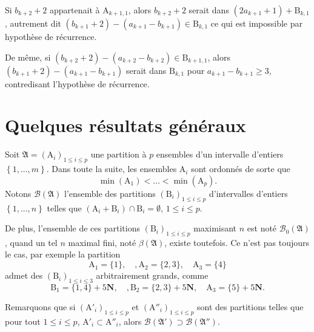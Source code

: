 \documentclass[11pt, oneside]{article}   	%
\newcommand{\interval}[2]{\left\{ #1, \dots, #2 \right\}}
\begin{document}
Si $b_{k+2} + 2$ appartenait à $\mathrm{A}_{k + 1, 1}$, alors $b_{k+2} + 2$ serait dans $(2 a_{k+1} + 1) + \mathrm{B}_{k, 1}$,
autrement dit $(b_{k+1} + 2) - (a_{k+1} - b_{k+1}) \in \mathrm{B}_{k, 1}$ ce qui est impossible par hypothèse de récurrence.

De même, si $(b_{k+2} + 2) - (a_{k+2} - b_{k+2}) \in \mathrm{B}_{k+1, 1}$, alors
$(b_{k+1} + 2) - (a_{k+1} - b_{k+1})$ serait dans $\mathrm{B}_{k, 1}$ pour $a_{k+1} - b_{k+1} \geqslant 3$,
contredisant l'hypothèse de récurrence.


\section{Quelques résultats généraux}

Soit $\mathfrak{A} = (\mathrm{A}_i)_{1 \leq i \leq p}$ une partition à $p$ ensembles d'un intervalle d'entiers $\interval{1}{m}$.
Dans toute la suite, les ensembles $\mathrm{A}_i$ sont ordonnés de sorte que
\begin{equation}\label{eq:ordre_min}
 \min(\mathrm{A}_1) < \dots < \min(\mathrm{A}_p).
\end{equation}
Notons $\mathcal{B}(\mathfrak{A})$ l'ensemble des partitions $(\mathrm{B}_i)_{1 \leqslant i \leqslant p}$ d'intervalles d'entiers $\interval{1}{n}$ telles que
$(\mathrm{A}_i + \mathrm{B}_i) \cap \mathrm{B}_i = \emptyset$, $1 \leqslant i \leqslant p$.

De plus, l'ensemble de ces partitions $(\mathrm{B}_i)_{1 \leqslant i \leqslant p}$ maximisant $n$ est noté $\mathcal{B}_0(\mathfrak{A})$,
quand un tel $n$ maximal fini, noté $\beta(\mathfrak{A})$, existe toutefois.
Ce n'est pas toujours le cas, par exemple la partition
\begin{equation}
 \mathrm{A}_1 = \{1\}, \quad, \mathrm{A}_2 = \{2, 3\}, \quad \mathrm{A}_3 = \{4\}
\end{equation}
admet des $(\mathrm{B}_i)_{1 \leqslant i \leqslant 3}$ arbitrairement grands, comme
\begin{equation}
 \mathrm{B}_1 = \{1, 4\} + 5 \mathbf{N}, \quad, \mathrm{B}_2 = \{2, 3\} + 5 \mathbf{N}, \quad \mathrm{A}_3 = \{5\} + 5 \mathbf{N}.
\end{equation}

Remarquons que si $(\mathrm{A}'_i)_{1 \leq i \leq p}$ et $(\mathrm{A}''_i)_{1 \leq i \leq p}$ sont des partitions telles que
pour tout $1 \leqslant i \leqslant p$, $\mathrm{A}'_i \subset \mathrm{A}''_i$,
alors $\mathcal{B}(\mathfrak{A}') \supset \mathcal{B}(\mathfrak{A}'')$.
\end{document}
